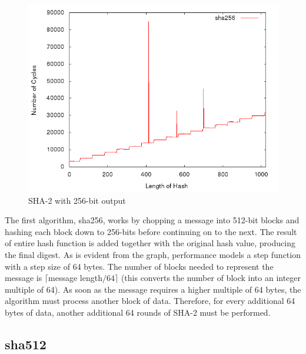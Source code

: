 \documentclass[10pt,a4paper]{article}
\begin{document}
    \begin{figure}[H]
        \begin{center}
            \includegraphics[scale=0.5]{images/sha256.png} 
            \caption{SHA-2 with 256-bit output}
        \end{center}
    \end{figure}

The first algorithm, sha256, works by chopping a message into 512-bit blocks and hashing each block down to 256-bits before continuing on to the next.  The result of entire hash function is added together with the original hash value, producing the final digest.  As is evident from the graph, performance models a step function with a step size of 64 bytes.  The number of blocks needed to represent the message is $\lceil$message length$/ 64 \rceil$ (this converts the number of block into an integer multiple of 64).  As soon as the message requires a higher multiple of 64 bytes, the algorithm must process another block of data.  Therefore, for every additional 64 bytes of data, another additional 64 rounds of SHA-2 must be performed.

\subsection{sha512}
\end{document}
